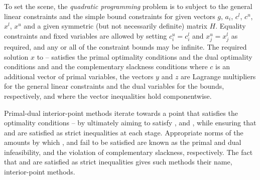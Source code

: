 \documentclass[twoside]{article}
\begin{document}
To set the scene, the {\em quadratic programming} problem is to
subject to the general linear constraints
and the simple bound constraints
for given
vectors $g$, $a_{i}$, $c^{l}$, $c^{u}$, $x^{l}$, $x^{u}$ 
and a given symmetric (but not necessarily definite) matrix $H$. Equality 
constraints and fixed variables are allowed by setting
$c_{i}^{u} = c_{i}^{l}$ and $x_{j}^{u} = x_{j}^{l}$ as required,
and any or all of the constraint bounds may be infinite.
The required solution $x$ to -- satisfies 
the primal optimality conditions
and 
the dual optimality conditions
and 
and the complementary slackness conditions 
where $c$ is an additional vector of primal variables,
the vectors $y$ and $z$ are Lagrange multipliers for
the general linear constraints and the dual variables for the bounds,
respectively, and where the vector inequalities hold componentwise.

Primal-dual interior-point methods iterate towards a point
that satisfies the optimality conditions --
by ultimately aiming to satisfy
,  and , while ensuring that 
 and  are 
satisfied as strict inequalities at each stage. 
Appropriate norms of the amounts by 
which ,  and  fail to be satisfied are known as the
primal and dual infeasibility, and the violation of complementary slackness,
respectively. The fact that  and  are satisfied as strict 
inequalities gives such methods their name, interior-point methods.
\end{document}
